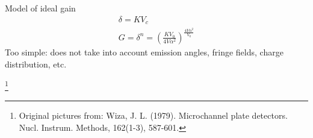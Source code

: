 \documentclass{beamer}
\begin{document}
\begin{frame}



        \vspace{15pt}
        \begin{block}{Model of ideal gain}
            \vspace{-25pt}
            \begin{gather*}
                \delta = KV_c \\
                G = \delta^n = \left(\frac{KV_0}{4V\alpha^2}\right)^{\frac{4V\alpha^2}{V_0}}
            \end{gather*}
            Too simple: does not take into account emission angles, fringe fields, charge distribution, etc.
        \end{block}


        \let\thefootnote\relax\footnote{Original pictures from: Wiza, J. L. (1979). Microchannel plate detectors. Nucl. Instrum. Methods, 162(1-3), 587-601.}
    \end{frame}
\end{document}
